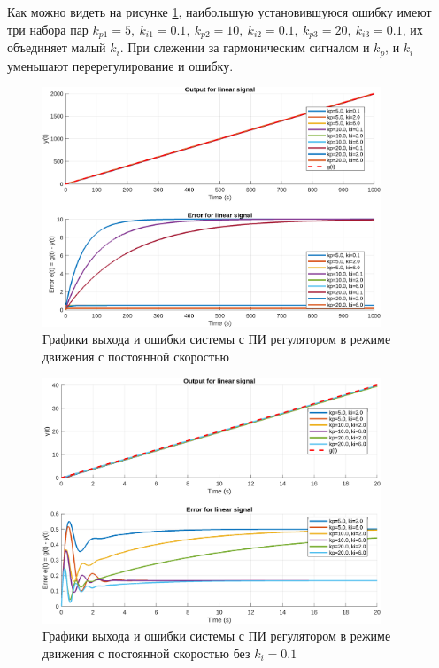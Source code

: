 Как можно видеть на рисунке \ref{fig:task_5_out_linear}, наибольшую установившуюся ошибку
имеют три набора пар $k_{p1}=5,\ k_{i1}=0.1,\ k_{p2}=10,\ k_{i2}=0.1,\ k_{p3}=20,\ k_{i3}=0.1$,
их объединяет малый $k_i$. При слежении за гармоническим сигналом и $k_p$, и $k_i$
уменьшают перерегулирование и ошибку.
\begin{figure}[H]
    \centering
    \includegraphics[width=0.9\textwidth]{figs/task_5_out_linear.png}
    \caption{Графики выхода и ошибки системы с ПИ регулятором в режиме движения с постоянной скоростью}
    \label{fig:task_5_out_linear}
\end{figure}
\begin{figure}[H]
    \centering
    \includegraphics[width=0.9\textwidth]{figs/task_5_out_1_linear.png}
    \caption{Графики выхода и ошибки системы с ПИ регулятором в режиме движения с постоянной скоростью без $k_i=0.1$}
    \label{fig:task_5_out_1_linear}
\end{figure}
